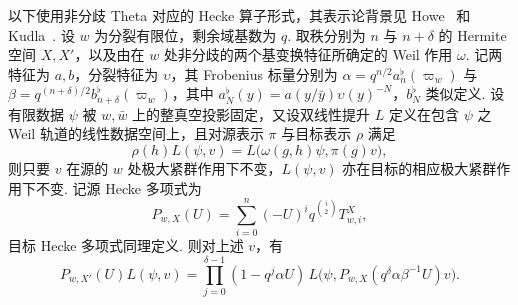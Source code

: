 \begin{lemma}
\label{lem:a-unramified-pairing-hecke}
\emitthmsource
以下使用非分歧 Theta 对应的 Hecke 算子形式，其表示论背景见 Howe~\cite{Howe1979} 和 Kudla~\cite{Kudla1986}. 设 $w$ 为分裂有限位，剩余域基数为 $q$. 取秩分别为 $n$ 与 $n+\delta$ 的 Hermite 空间 $X,X'$，以及由在 $w$ 处非分歧的两个基变换特征所确定的 Weil 作用 $\omega$. 记两特征为 $a,b$，分裂特征为 $\upsilon$，其 Frobenius 标量分别为 $\alpha=q^{n/2}a^\flat_n(\varpi_w)$ 与 $\beta=q^{(n+\delta)/2}b^\flat_{n+\delta}(\varpi_w)$，其中 $a^\flat_N(y)=a(y/\bar y)\upsilon(y)^{-N}$，$b^\flat_N$ 类似定义. 设有限数据 $\psi$ 被 $w,\bar w$ 上的整真空投影固定，又设双线性提升 $L$ 定义在包含 $\psi$ 之 Weil 轨道的线性数据空间上，且对源表示 $\pi$ 与目标表示 $\rho$ 满足
\[
 \rho(h)L(\psi,v)=L\bigl(\omega(g,h)\psi,\pi(g)v\bigr),
\]
则只要 $v$ 在源的 $w$ 处极大紧群作用下不变，$L(\psi,v)$ 亦在目标的相应极大紧群作用下不变. 记源 Hecke 多项式为
\[
 P_{w,X}(U)=\sum_{i=0}^{n}(-U)^i q^{\binom i2}T_{w,i}^{X},
\]
目标 Hecke 多项式同理定义. 则对上述 $v$，有
\[
 P_{w,X'}(U)L(\psi,v)=
 \prod_{j=0}^{\delta-1}(1-q^j\alpha U)\,
 L\bigl(\psi,P_{w,X}(q^\delta\alpha\beta^{-1}U)v\bigr).
\]
\end{lemma}
